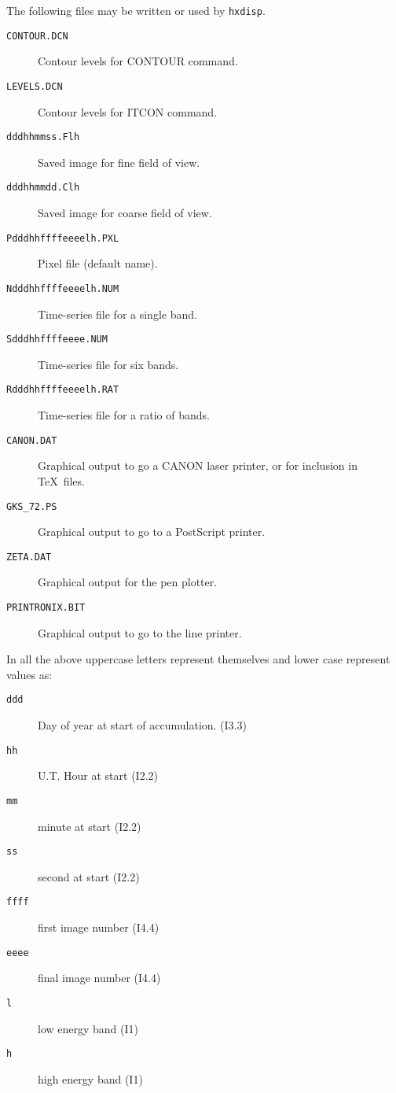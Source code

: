 The following files may be written or used by \verb!hxdisp!.
\begin{description}
\item[\tt CONTOUR.DCN] Contour levels for CONTOUR command.
\item[\tt LEVELS.DCN] Contour levels for ITCON command.
\item[\tt dddhhmmss.Flh] Saved image for fine field of view.
\item[\tt dddhhmmdd.Clh] Saved image for coarse field of view.
\item[\tt Pdddhhffffeeeelh.PXL] Pixel file (default name).
\item[\tt Ndddhhffffeeeelh.NUM] Time-series file for a single band.
\item[\tt Sdddhhffffeeee.NUM] Time-series file for six bands.
\item[\tt Rdddhhffffeeeelh.RAT] Time-series file for a ratio of bands.
\item[\tt CANON.DAT] Graphical output to go a CANON laser printer, or
for inclusion in \TeX\ files.
\item[\tt GKS\_72.PS] Graphical output to go to a PostScript printer.
\item[\tt ZETA.DAT] Graphical output for the pen plotter.
\item[\tt PRINTRONIX.BIT] Graphical output to go to the line printer.
\end{description}
In all the above uppercase letters represent themselves and lower case
represent values as:
\begin{description}
\item[\tt ddd] Day of year at start of accumulation. (I3.3)
\item[\tt hh] U.T. Hour at start (I2.2)
\item[\tt mm] minute at start (I2.2)
\item[\tt ss] second at start (I2.2)
\item[\tt ffff] first image number (I4.4)
\item[\tt eeee] final image number (I4.4)
\item[\tt l] low energy band (I1)
\item[\tt h] high energy band (I1)
\end{description}

